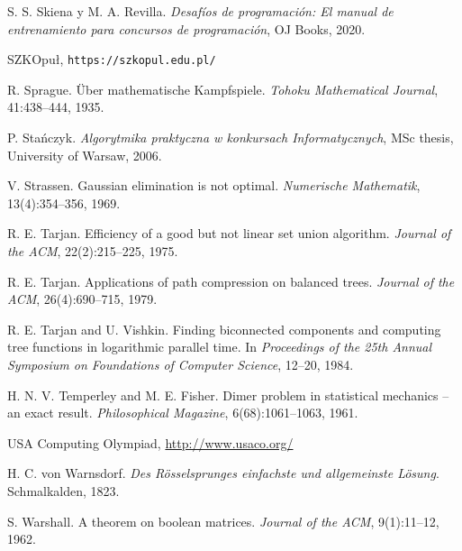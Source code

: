 \begin{thebibliography}{9}
    S. S. Skiena y M. A. Revilla.
    \emph{Desafíos de programación: El manual de entrenamiento para concursos de programación},
    OJ Books, 2020.

    SZKOpuł, \texttt{https://szkopul.edu.pl/}

    R. Sprague.
    Über mathematische Kampfspiele.
    \emph{Tohoku Mathematical Journal}, 41:438--444, 1935.

    P. Stańczyk.
    \emph{Algorytmika praktyczna w konkursach Informatycznych},
    MSc thesis, University of Warsaw, 2006.

    V. Strassen.
    Gaussian elimination is not optimal.
    \emph{Numerische Mathematik}, 13(4):354--356, 1969.

    R. E. Tarjan.
    Efficiency of a good but not linear set union algorithm.
    \emph{Journal of the ACM}, 22(2):215--225, 1975.

    R. E. Tarjan.
    Applications of path compression on balanced trees.
    \emph{Journal of the ACM}, 26(4):690--715, 1979.

    R. E. Tarjan and U. Vishkin.
    Finding biconnected components and computing tree functions in logarithmic parallel time.
    In \emph{Proceedings of the 25th Annual Symposium on Foundations of Computer Science}, 12--20, 1984.

    H. N. V. Temperley and M. E. Fisher.
    Dimer problem in statistical mechanics -- an exact result.
    \emph{Philosophical Magazine}, 6(68):1061--1063, 1961.

    USA Computing Olympiad, \url{http://www.usaco.org/}

    H. C. von Warnsdorf.
    \emph{Des Rösselsprunges einfachste und allgemeinste Lösung}.
    Schmalkalden, 1823.

    S. Warshall.
    A theorem on boolean matrices.
    \emph{Journal of the ACM}, 9(1):11--12, 1962.


\end{thebibliography}
